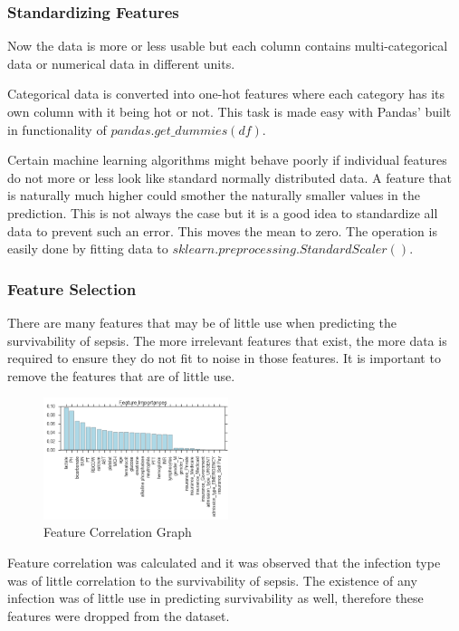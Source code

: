 \documentclass[11pt]{article}
\begin{document}
		\subsubsection{Standardizing Features}
		Now the data is more or less usable but each column contains multi-categorical data or numerical data in different units.
		
		Categorical data is converted into one-hot features where each category has its own column with it being hot or not. This task is made easy with Pandas' built in functionality of \(pandas.get\_dummies(df)\).
		
		Certain machine learning algorithms might behave poorly if individual features do not more or less look like standard normally distributed data. A feature that is naturally much higher could smother the naturally smaller values in the prediction. This is not always the case but it is a good idea to standardize all data to prevent such an error. This moves the mean to zero. The operation is easily done by fitting data to \(sklearn.preprocessing.StandardScaler()\).
		
		\subsubsection{Feature Selection}
		There are many features that may be of little use when predicting the survivability of sepsis. The more irrelevant features that exist, the more data is required to ensure they do not fit to noise in those features. It is important to remove the features that are of little use. 
		
		\begin{figure}
			\begin{center}
				\includegraphics[width=0.48\textwidth]{feature_correlation_2.png}
			\end{center}
			\caption{Feature Correlation Graph}
		\end{figure}
		
		Feature correlation was calculated and it was observed that the infection type was of little correlation to the survivability of sepsis. The existence of any infection was of little use in predicting survivability as well, therefore these features were dropped from the dataset.
		
\end{document}
